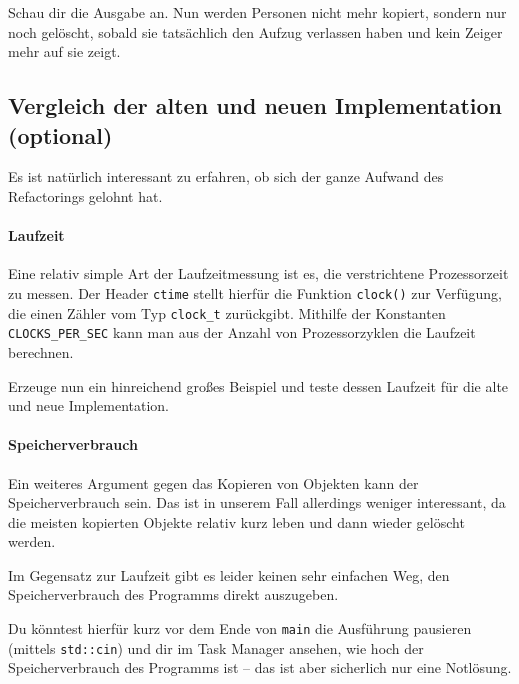 Schau dir die Ausgabe an.
Nun werden Personen nicht mehr kopiert, sondern nur noch gelöscht, sobald sie tatsächlich den Aufzug verlassen haben und kein Zeiger mehr auf sie zeigt.

\subsection{Vergleich der alten und neuen Implementation (optional)}

Es ist natürlich interessant zu erfahren, ob sich der ganze Aufwand des Refactorings gelohnt hat.

\paragraph{Laufzeit}
Eine relativ simple Art der Laufzeitmessung ist es, die verstrichtene Prozessorzeit zu messen.
Der Header \texttt{ctime} stellt hierfür die Funktion \texttt{clock()} zur Verfügung, die einen Zähler vom Typ \texttt{clock\_t} zurückgibt.
Mithilfe der Konstanten \texttt{CLOCKS\_PER\_SEC} kann man aus der Anzahl von Prozessorzyklen die Laufzeit berechnen.

Erzeuge nun ein hinreichend großes Beispiel und teste dessen Laufzeit für die alte und neue Implementation.



\paragraph{Speicherverbrauch}
Ein weiteres Argument gegen das Kopieren von Objekten kann der Speicherverbrauch sein.
Das ist in unserem Fall allerdings weniger interessant, da die meisten kopierten Objekte relativ kurz leben und dann wieder gelöscht werden.

Im Gegensatz zur Laufzeit gibt es leider keinen sehr einfachen Weg, den Speicherverbrauch des Programms direkt auszugeben.

Du könntest hierfür kurz vor dem Ende von \texttt{main} die Ausführung pausieren (mittels \texttt{std::cin}) und dir im Task Manager ansehen, wie hoch der Speicherverbrauch des Programms ist -- das ist aber sicherlich nur eine Notlösung.

